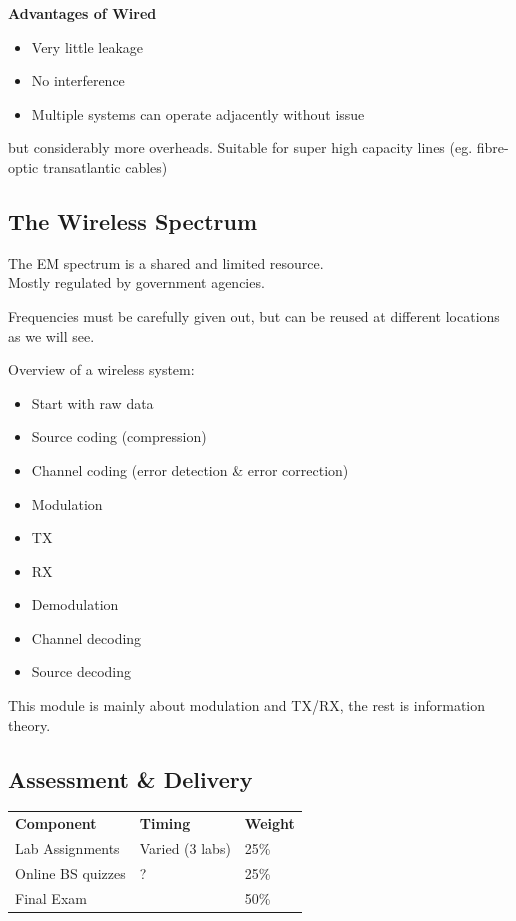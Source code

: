 \documentclass[12pt]{article}
\begin{document}
\textbf{Advantages of Wired}

\begin{itemize}[noitemsep]
    \item Very little leakage
    \item No interference
    \item Multiple systems can operate adjacently without issue
\end{itemize}
but considerably more overheads.
Suitable for super high capacity lines (eg. fibre-optic transatlantic cables)

\subsection{The Wireless Spectrum}
The EM spectrum is a shared and limited resource.\\
Mostly regulated by government agencies.

Frequencies must be carefully given out, but can be reused at different locations as we will see.

Overview of a wireless system:
\begin{itemize}[noitemsep]
\item Start with raw data
\item Source coding (compression)
\item Channel coding (error detection \& error correction)
\item Modulation
\item TX
\item RX
\item Demodulation
\item Channel decoding
\item Source decoding
\end{itemize}

This module is mainly about modulation and TX/RX, the rest is information theory.

\subsection{Assessment \& Delivery}
    \begin{tabular}{ l l l }
        \textbf{Component} & \textbf{Timing} & \textbf{Weight} \\
        Lab Assignments & Varied (3 labs) & 25\% \\
        Online BS quizzes & ? & 25\% \\
        Final Exam & & 50\%
    \end{tabular}
\end{document}
